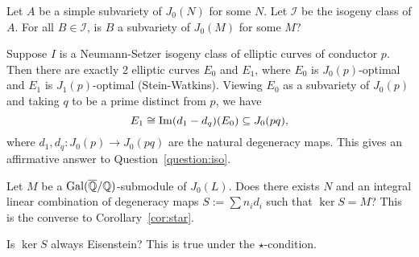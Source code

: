 \documentclass{article}
\begin{document}
\begin{question}
    \label{question:iso}
    Let $A$ be a simple subvariety of $J_0(N)$ for some $N$. Let $\mathcal{I}$
    be the isogeny class of $A$. For all $B\in \mathcal{I}$, is $B$ a
    subvariety of $J_0(M)$ for some $M$?
\end{question}

\begin{example}
    Suppose $I$ is a Neumann-Setzer isogeny class of elliptic curves of
    conductor $p$. Then there are exactly 2 elliptic curves $E_0$ and $E_1$,
    where $E_0$ is $J_0(p)$-optimal and $E_1$ is $J_1(p)$-optimal
    (Stein-Watkins). Viewing $E_0$ as a subvariety of $J_0(p)$ and taking $q$
    to be a prime distinct from $p$, we have
    \[
        E_1 \cong \operatorname{Im} (d_1-d_q)(E_0)\subseteq J_0(pq),
    \]
    where $d_1, d_q:J_0(p)\to J_0(pq)$ are the natural degeneracy maps. This
    gives an affirmative answer to Question~\ref{question:iso}.
\end{example}


\begin{question}
    Let $M$ be a $\operatorname{Gal}(\overline{\mathbb{Q}}/\mathbb{Q})$-submodule of $J_0(L)$. Does there exists
    $N$ and an integral linear combination of degeneracy maps $S:=\sum n_i d_i$
    such that $\ker S=M$? This is the converse to Corollary~\ref{cor:star}.
\end{question}

\begin{question}
    Is $\ker S$ always Eisenstein? This is true under the $\star$-condition.
\end{question}
\end{document}
